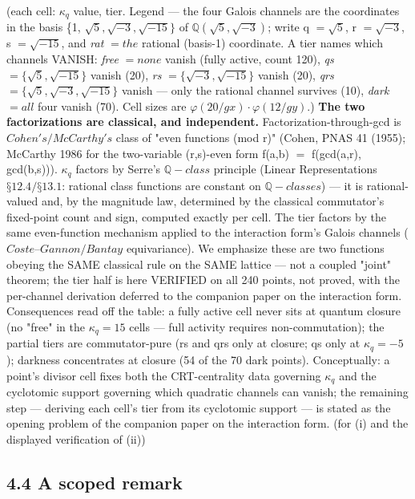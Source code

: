 \documentclass[11pt]{article}
\theoremstyle{plain}
\theoremstyle{definition}
\theoremstyle{remark}
\begin{document}
(each cell: \(\kappa _{q}\) value, tier. Legend — the four Galois channels are the coordinates in the basis \{1, \(\sqrt{5}, \sqrt{-3}, \sqrt{-15}\}\) of \(\mathbb{Q}(\sqrt{5},\sqrt{-3})\); write q \(= \sqrt{5}\), r \(= \sqrt{-3}\), s \(= \sqrt{-15}\), and \emph{rat} \(= the\) rational (basis-1) coordinate. A tier names which channels VANISH: \emph{free} \(= none\) vanish (fully active, count 120), \emph{qs} \(= \{\sqrt{5},\sqrt{-15}\}\) vanish (20), \emph{rs} \(= \{\sqrt{-3},\sqrt{-15}\}\) vanish (20), \emph{qrs} \(= \{\sqrt{5},\sqrt{-3},\sqrt{-15}\}\) vanish — only the rational channel survives (10), \emph{dark} \(= all\) four vanish (70). Cell sizes are \(\varphi (20/gx)\cdot \varphi (12/gy)\).) \textbf{The two factorizations are classical, and independent.} Factorization-through-gcd is \(Cohen's/McCarthy's\) class of "even functions (mod r)" (Cohen, PNAS 41 (1955); McCarthy 1986 for the two-variable (r,s)-even form f(a,b) \(=\) f(gcd(a,r), gcd(b,s))). \(\kappa _{q}\) factors by Serre's \(\mathbb{Q}-class\) principle (Linear Representations \(§12.4/§13.1\): rational class functions are constant on \(\mathbb{Q}-classes\)) — it is rational-valued and, by the magnitude law, determined by the classical commutator's fixed-point count and sign, computed exactly per cell. The tier factors by the same even-function mechanism applied to the interaction form's Galois channels (\(Coste–Gannon/Bantay\) equivariance). We emphasize these are two functions obeying the SAME classical rule on the SAME lattice — not a coupled "joint" theorem; the tier half is here VERIFIED on all 240 points, not proved, with the per-channel derivation deferred to the companion paper on the interaction form. Consequences read off the table: a fully active cell never sits at quantum closure (no "free" in the \(\kappa _{q} = 15\) cells — full activity requires non-commutation); the partial tiers are commutator-pure (rs and qrs only at closure; qs only at \(\kappa _{q} = -5\)); darkness concentrates at closure (54 of the 70 dark points). Conceptually: a point's divisor cell fixes both the CRT-centrality data governing \(\kappa _{q}\) and the cyclotomic support governing which quadratic channels can vanish; the remaining step — deriving each cell's tier from its cyclotomic support — is stated as the opening problem of the companion paper on the interaction form.  (for (i) and the displayed verification of (ii))

\subsection{4.4 A scoped remark}
\end{document}
